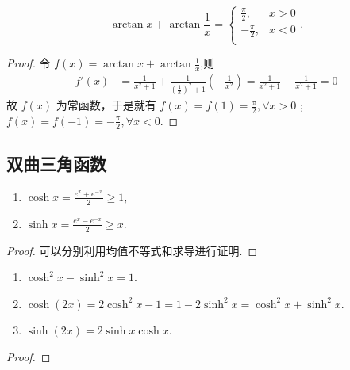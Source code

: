\documentclass[../../main.tex]{subfiles}%
\begin{document}
\begin{proposition}\label{proposition:arctan相关等式}
$$\arctan x+\arctan \frac{1}{x}=\begin{cases}
\frac{\pi}{2},&x>0\\
-\frac{\pi}{2},&x<0\\
\end{cases}.$$
\end{proposition}
\begin{proof}

令 \( f(x)=\arctan x+\arctan\frac{1}{x} \),则
\begin{align*}
f'(x)&=\frac{1}{x^2 + 1}+\frac{1}{(\frac{1}{x})^2 + 1}(-\frac{1}{x^2})=\frac{1}{x^2 + 1}-\frac{1}{x^2 + 1}=0
\end{align*}
故 \( f(x) \) 为常函数，于是就有 \( f(x)=f(1)=\frac{\pi}{2},\forall x>0 \) ;\( f(x)=f(-1)=-\frac{\pi}{2},\forall x<0 \).

\end{proof}


\subsection{双曲三角函数}

\begin{proposition}
\begin{enumerate}[(1)]
\item $\cosh x=\frac{e^{x}+e^{-x}}{2}\geqslant1,$

\item $\sinh x=\frac{e^{x}-e^{-x}}{2}\geqslant x.$
\end{enumerate}
\end{proposition}
\begin{proof}

可以分别利用均值不等式和求导进行证明. 

\end{proof}

\begin{proposition}\label{proposition:双曲三角函数基本性质}
\begin{enumerate}
\item $\cosh^2 x-\sinh^2 x=1$.

\item $\cosh(2x)=2\cosh^2 x-1=1-2\sinh^2 x=\cosh^2 x+\sinh^2 x$.

\item $\sinh(2x)=2\sinh x\cosh x$. 
\end{enumerate}
\end{proposition}
\begin{proof}



\end{proof}
\end{document}
